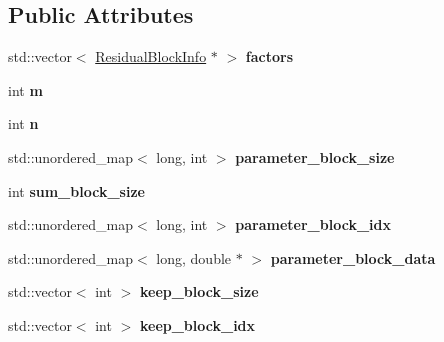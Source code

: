 \subsection*{Public Attributes}
\begin{DoxyCompactItemize}
\item 
\mbox{\label{classMarginalizationInfo_a8a2a015d34d76a471af8ad0189177cbe}} 
std\+::vector$<$ \hyperlink{structResidualBlockInfo}{Residual\+Block\+Info} $\ast$ $>$ {\bfseries factors}
\item 
\mbox{\label{classMarginalizationInfo_a7f96a588cc15c57a43a6989ac71e8391}} 
int {\bfseries m}
\item 
\mbox{\label{classMarginalizationInfo_aef84efe405df7aaf4b734854db78efdd}} 
int {\bfseries n}
\item 
\mbox{\label{classMarginalizationInfo_ad954ee7201a7eedf2129312bd4d4beba}} 
std\+::unordered\+\_\+map$<$ long, int $>$ {\bfseries parameter\+\_\+block\+\_\+size}
\item 
\mbox{\label{classMarginalizationInfo_a2ce2773233a4c42a2ec4927ddc8194e9}} 
int {\bfseries sum\+\_\+block\+\_\+size}
\item 
\mbox{\label{classMarginalizationInfo_a1a60184e08f4063d773a0c136062b1bb}} 
std\+::unordered\+\_\+map$<$ long, int $>$ {\bfseries parameter\+\_\+block\+\_\+idx}
\item 
\mbox{\label{classMarginalizationInfo_a014858562a2c46adeb55db887e6d80e7}} 
std\+::unordered\+\_\+map$<$ long, double $\ast$ $>$ {\bfseries parameter\+\_\+block\+\_\+data}
\item 
\mbox{\label{classMarginalizationInfo_a27c91458e315bcf551d3d626376c6f16}} 
std\+::vector$<$ int $>$ {\bfseries keep\+\_\+block\+\_\+size}
\item 
\mbox{\label{classMarginalizationInfo_a254a4613735e08d93fd94237dfbf4833}} 
std\+::vector$<$ int $>$ {\bfseries keep\+\_\+block\+\_\+idx}
\item 

\end{DoxyCompactItemize}

